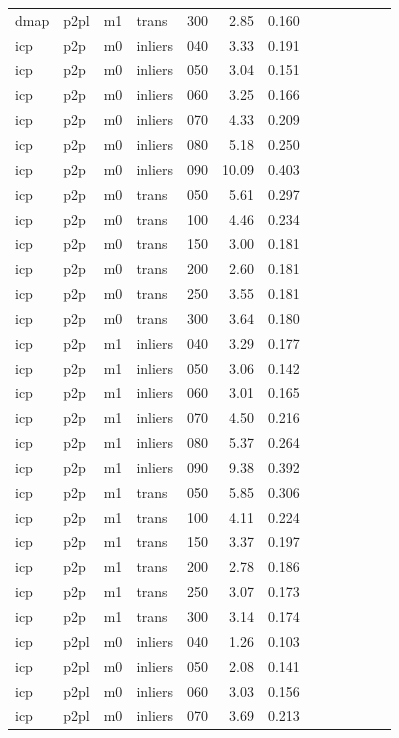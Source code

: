 \begin{table}[htbp]
\begin{tabular}{lllllrrrrrrrr}
  dmap & p2pl & m1 & trans & 300 & 2.85 & 0.160 \\
  icp & p2p & m0 & inliers & 040 & 3.33 & 0.191 \\
  icp & p2p & m0 & inliers & 050 & 3.04 & 0.151 \\
  icp & p2p & m0 & inliers & 060 & 3.25 & 0.166 \\
  icp & p2p & m0 & inliers & 070 & 4.33 & 0.209 \\
  icp & p2p & m0 & inliers & 080 & 5.18 & 0.250 \\
  icp & p2p & m0 & inliers & 090 & 10.09 & 0.403 \\
  icp & p2p & m0 & trans & 050 & 5.61 & 0.297 \\
  icp & p2p & m0 & trans & 100 & 4.46 & 0.234 \\
  icp & p2p & m0 & trans & 150 & 3.00 & 0.181 \\
  icp & p2p & m0 & trans & 200 & 2.60 & 0.181 \\
  icp & p2p & m0 & trans & 250 & 3.55 & 0.181 \\
  icp & p2p & m0 & trans & 300 & 3.64 & 0.180 \\
  icp & p2p & m1 & inliers & 040 & 3.29 & 0.177 \\
  icp & p2p & m1 & inliers & 050 & 3.06 & 0.142 \\
  icp & p2p & m1 & inliers & 060 & 3.01 & 0.165 \\
  icp & p2p & m1 & inliers & 070 & 4.50 & 0.216 \\
  icp & p2p & m1 & inliers & 080 & 5.37 & 0.264 \\
  icp & p2p & m1 & inliers & 090 & 9.38 & 0.392 \\
  icp & p2p & m1 & trans & 050 & 5.85 & 0.306 \\
  icp & p2p & m1 & trans & 100 & 4.11 & 0.224 \\
  icp & p2p & m1 & trans & 150 & 3.37 & 0.197 \\
  icp & p2p & m1 & trans & 200 & 2.78 & 0.186 \\
  icp & p2p & m1 & trans & 250 & 3.07 & 0.173 \\
  icp & p2p & m1 & trans & 300 & 3.14 & 0.174 \\
  icp & p2pl & m0 & inliers & 040 & 1.26 & 0.103 \\
  icp & p2pl & m0 & inliers & 050 & 2.08 & 0.141 \\
  icp & p2pl & m0 & inliers & 060 & 3.03 & 0.156 \\
  icp & p2pl & m0 & inliers & 070 & 3.69 & 0.213 \\

\end{tabular}
\end{table}
